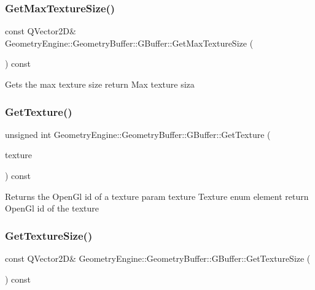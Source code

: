 \subsubsection{\texorpdfstring{GetMaxTextureSize()}{GetMaxTextureSize()}}
{\footnotesize\ttfamily const Q\+Vector2D\& Geometry\+Engine\+::\+Geometry\+Buffer\+::\+G\+Buffer\+::\+Get\+Max\+Texture\+Size (\begin{DoxyParamCaption}{ }\end{DoxyParamCaption}) const\hspace{0.3cm}{\ttfamily [inline]}}

Gets the max texture size return Max texture siza \mbox{\label{class_geometry_engine_1_1_geometry_buffer_1_1_g_buffer_a2ea57f74fe7c40ea19d120ee271daeca}} 
\subsubsection{\texorpdfstring{GetTexture()}{GetTexture()}}
{\footnotesize\ttfamily unsigned int Geometry\+Engine\+::\+Geometry\+Buffer\+::\+G\+Buffer\+::\+Get\+Texture (\begin{DoxyParamCaption}\item[{\mbox{\hyperlink{class_geometry_engine_1_1_geometry_buffer_1_1_g_buffer_a718dceafcac1915f7de061108597e1cc}{G\+B\+U\+F\+F\+E\+R\+\_\+\+T\+E\+X\+T\+U\+R\+E\+\_\+\+T\+Y\+PE}}}]{texture }\end{DoxyParamCaption}) const\hspace{0.3cm}{\ttfamily [inline]}}

Returns the Open\+Gl id of a texture param texture Texture enum element return Open\+Gl id of the texture \mbox{\label{class_geometry_engine_1_1_geometry_buffer_1_1_g_buffer_a2b829115597fc587cd6f4ddb52b875cc}} 
\subsubsection{\texorpdfstring{GetTextureSize()}{GetTextureSize()}}
{\footnotesize\ttfamily const Q\+Vector2D\& Geometry\+Engine\+::\+Geometry\+Buffer\+::\+G\+Buffer\+::\+Get\+Texture\+Size (\begin{DoxyParamCaption}{ }\end{DoxyParamCaption}) const\hspace{0.3cm}{\ttfamily [inline]}}

